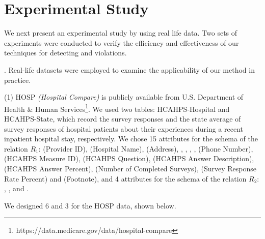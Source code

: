 \section{Experimental Study}
\label{sec-exp}

We next present an experimental study by using real life data. Two sets of experiments
were conducted to verify the efficiency and effectiveness of our techniques for detecting \pCFDs and \pCINDs
violations.

. Real-life datasets were employed to examine the applicability of our method in practice.

(1) HOSP \textit{(Hospital Compare)} is publicly available from U.S. Department of Health
\& Human Services\footnote{https://data.medicare.gov/data/hospital-compare}. We used two tables: HCAHPS-Hospital and HCAHPS-State, which record the survey responses and the state average of survey responses of hospital patients about their experiences during a recent inpatient hospital stay, respectively. We chose 15 attributes for the schema of the relation $R_1$:  (Provider ID),  (Hospital Name),  (Address), , , , ,  (Phone Number),  (HCAHPS Measure ID),  (HCAHPS Question),  (HCAHPS Answer Description),  (HCAHPS Answer Percent),  (Number of Completed Surveys),  (Survey Response Rate Percent) and  (Footnote), and 4 attributes for the schema of the relation $R_2$: , ,  and .

We designed 6 \pCFDs and 3 \pCINDs for the HOSP data, shown below.

